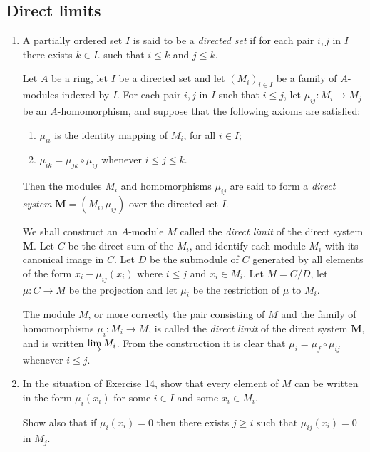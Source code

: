 \documentclass{standalone}
\theoremstyle{definition}
\theoremstyle{remark}
\begin{document}
\subsection*{Direct limits}
\begin{enumerate}[resume*=exc2]
  \item A partially ordered set $I$ is said to be a {\itshape directed set} if for each
        pair $i, j$ in $I$ there exists $k \in I$. such that $i \leq k$ and
        $j \leq k$.

Let $A$ be a ring, let $I$ be a directed set and let
$(M_{i})_{i \in I}$ be a family of $A$-modules indexed by $I$. For
each pair $i, j$ in $I$ such that $i \leq j$, let
$\mu_{i j}: M_{i} \to M_{j}$ be an $A$-homomorphism, and suppose that the
following axioms are satisfied:
\begin{enumerate}
\item $\mu_{ii}$ is the identity mapping of
$M_{i}$, for all $i \in I$;
\item $\mu_{i k}=\mu_{j k} \circ \mu_{i j}$ whenever $i \leq j \leq
  k$.
\end{enumerate}
Then the modules $M_{i}$ and homomorphisms $\mu_{i j}$ are said to
form a {\itshape direct
system} $\mathbf{M}=(M_{i}, \mu_{i j})$ over the directed
set $I$.

We shall construct an $A$-module $M$ called the {\itshape direct limit} of the direct
system $\mathbf{M}$. Let $C$ be the direct sum of the $M_{i}$, and identify each module
$M_{i}$ with its canonical image in $C$. Let $D$ be the submodule of $C$
generated by all elements of the form $x_{i}-\mu_{i j}(x_{i})$ where
$i \leq j$ and $x_{i} \in M_{i}$. Let $M=C / D$, let $\mu: C \to M$ be the
projection and let $\mu_{i}$ be the restriction of $\mu$ to $M_{i}$.

The module $M$, or more correctly the pair consisting of $M$ and the family of
homomorphisms $\mu_{i}: M_{i} \to M$, is called the {\itshape direct
  limit} of the direct 
system $\mathbf{M}$, and is written $\varinjlim M_{i}$. From the construction
it is clear that $\mu_{i}=\mu_{f} \circ \mu_{i j}$ whenever $i \leq j$.

  \item In the situation of Exercise 14, show that every element of $M$ can be
        written in the form $\mu_{i}(x_{i})$ for some $i \in I$ and
        some $x_{i} \in M_{i}$.
        
Show also that if $\mu_{i}(x_{i})=0$ then there exists
$j \geq i$ such that $\mu_{i j}(x_{i})=0$ in
$M_{j}$.


\end{enumerate}
\end{document}
